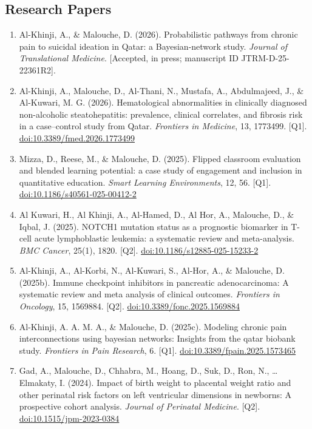 \documentclass[11pt,a4paper,sans]{moderncv}
\begin{document}
\subsection{Research Papers}
\begin{enumerate}
\item Al-Khinji, A., \& Malouche, D. (2026). Probabilistic pathways from chronic pain to suicidal ideation in Qatar: a Bayesian-network study. \textit{Journal of Translational Medicine}. [Accepted, in press; manuscript ID JTRM-D-25-22361R2].
\item Al-Khinji, A., Malouche, D., Al-Thani, N., Mustafa, A., Abdulmajeed, J., \& Al-Kuwari, M. G. (2026). Hematological abnormalities in clinically diagnosed non-alcoholic steatohepatitis: prevalence, clinical correlates, and fibrosis risk in a case--control study from Qatar. \textit{Frontiers in Medicine}, 13, 1773499. [Q1]. \href{https://doi.org/10.3389/fmed.2026.1773499}{doi:10.3389/fmed.2026.1773499}
\item Mizza, D., Reese, M., \& Malouche, D. (2025). Flipped classroom evaluation and blended learning potential: a case study of engagement and inclusion in quantitative education. \textit{Smart Learning Environments}, 12, 56. [Q1]. \href{https://doi.org/10.1186/s40561-025-00412-2}{doi:10.1186/s40561-025-00412-2}
\item Al Kuwari, H., Al Khinji, A., Al-Hamed, D., Al Hor, A., Malouche, D., \& Iqbal, J. (2025). NOTCH1 mutation status as a prognostic biomarker in T-cell acute lymphoblastic leukemia: a systematic review and meta-analysis. \textit{BMC Cancer}, 25(1), 1820. [Q2]. \href{https://doi.org/10.1186/s12885-025-15233-2}{doi:10.1186/s12885-025-15233-2}
\item Al-Khinji, A., Al-Korbi, N., Al-Kuwari, S., Al-Hor, A., \& Malouche, D. (2025b). Immune checkpoint inhibitors in pancreatic adenocarcinoma: A systematic review and meta analysis of clinical outcomes. \textit{Frontiers in Oncology}, 15, 1569884. [Q2]. \href{https://doi.org/10.3389/fonc.2025.1569884}{doi:10.3389/fonc.2025.1569884}
\item Al-Khinji, A. A. M. A., \& Malouche, D. (2025c). Modeling chronic pain interconnections using bayesian networks: Insights from the qatar biobank study. \textit{Frontiers in Pain Research}, 6. [Q1]. \href{https://doi.org/10.3389/fpain.2025.1573465}{doi:10.3389/fpain.2025.1573465}
\item Gad, A., Malouche, D., Chhabra, M., Hoang, D., Suk, D., Ron, N., \ldots Elmakaty, I. (2024). Impact of birth weight to placental weight ratio and other perinatal risk factors on left ventricular dimensions in newborns: A prospective cohort analysis. \textit{Journal of Perinatal Medicine}. [Q2]. \href{https://doi.org/10.1515/jpm-2023-0384}{doi:10.1515/jpm-2023-0384}

\end{enumerate}
\end{document}
